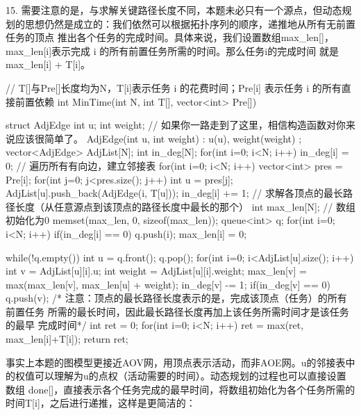 \begin{exerciseanswer}
15. 需要注意的是，与求解关键路径长度不同，本题未必只有一个源点，但动态规划的思想仍然是成立的：我们依然可以根据拓扑序列的顺序，递推地从所有无前置任务的顶点
推出各个任务的完成时间。具体来说，我们设置数组max\_len[]，max\_len[i]表示完成 i 的所有前置任务所需的时间。那么任务i的完成时间
就是max\_len[i] + T[i]。
\begin{cppcode}
    // T[]与Pre[]长度均为N，T[i]表示任务 i 的花费时间；Pre[i] 表示任务 i 的所有直接前置依赖
    int MinTime(int N, int T[], vector<int> Pre[]) {
        struct AdjEdge {
            int u;
            int weight;
            // 如果你一路走到了这里，相信构造函数对你来说应该很简单了。
            AdjEdge(int u, int weight) : u(u), weight(weight) {}
        };
        vector<AdjEdge> AdjList[N];
        int in_deg[N];
        for(int i=0; i<N; i++) {
            in_deg[i] = 0;
        }   
        // 遍历所有有向边，建立邻接表
        for(int i=0; i<N; i++) {
            vector<int> pres = Pre[i];
            for(int j=0; j<pres.size(); j++) {
                int u = pres[j];
                AdjList[u].push_back(AdjEdge(i, T[u]));
                in_deg[i] += 1;
            }   
        }
        // 求解各顶点的最长路径长度（从任意源点到该顶点的路径长度中最长的那个）
        int max_len[N];
        // 数组初始化为0
        memset(max_len, 0, sizeof(max_len));
        queue<int> q;
        for(int i=0; i<N; i++) {
            if(in_deg[i] == 0) {
                q.push(i);
                max_len[i] = 0;
            }
        }
        
        while(!q.empty()) {
            int u = q.front();
            q.pop();
            for(int i=0; i<AdjList[u].size(); i++) {
                int v = AdjList[u][i].u;
                int weight = AdjList[u][i].weight;
                max_len[v] = max(max_len[v], max_len[u] + weight);
                in_deg[v] -= 1;
                if(in_deg[v] == 0) {
                    q.push(v);
                }
            }
        }
        /* 注意：顶点的最长路径长度表示的是，完成该顶点（任务）的所有前置任务
        所需的最长时间，因此最长路径长度再加上该任务所需时间才是该任务的最早
        完成时间*/
        int ret = 0;
        for(int i=0; i<N; i++) {
            ret = max(ret, max_len[i]+T[i]);
        }
        return ret;
        
    }
\end{cppcode}
事实上本题的图模型更接近AOV网，用顶点表示活动，而非AOE网。u的邻接表中的权值可以理解为u的点权（活动需要的时间）。动态规划的过程也可以直接设置数组
done[]，直接表示各个任务完成的最早时间，将数组初始化为各个任务所需的时间T[i]，之后进行递推，这样是更简洁的：


\end{exerciseanswer}
